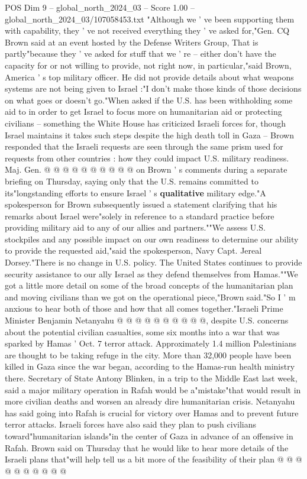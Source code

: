 \begin{textsample}{POS Dim 9 – global\_north\_2024\_03 – Score 1.00 – global\_north\_2024\_03/107058453.txt}  \label{ex:f9_pos_280}
"Although we ' ve been supporting them with capability, they ' ve not received everything they ' ve asked for,"Gen.
CQ Brown said at an event hosted by the Defense Writers Group, That is partly"because they ' ve asked for stuff that we ' re -- either don't have the capacity for or not willing to provide, not right now, in particular,"said Brown, America ' s top military officer.
He did not provide details about what weapons systems are not being given to Israel :"I don't make those kinds of those decisions on what goes or doesn't go."When asked if the U.S. has been withholding some aid to in order to get Israel to focus more on humanitarian aid or protecting civilians -- something the White House has criticized Israeli forces for, though Israel maintains it takes such steps despite the high death toll in Gaza -- Brown responded that the Israeli requests are seen through the same prism used for requests from other countries : how they could impact U.S. military readiness.
Maj.
Gen. @ @ @ @ @ @ @ @ @ @ on Brown ' s comments during a separate briefing on Thursday, saying only that the U.S. remains committed to its"longstanding efforts to ensure Israel ' s \textbf{qualitative} military edge."A spokesperson for Brown subsequently issued a statement clarifying that his remarks about Israel were"solely in reference to a standard practice before providing military aid to any of our allies and partners.""We assess U.S. stockpiles and any possible impact on our own readiness to determine our ability to provide the requested aid,"said the spokesperson, Navy Capt.
Jereal Dorsey."There is no change in U.S. policy.
The United States continues to provide security assistance to our ally Israel as they defend themselves from Hamas.""We got a little more detail on some of the broad concepts of the humanitarian plan and moving civilians than we got on the operational piece,"Brown said."So I ' m anxious to hear both of those and how that all comes together."Israeli Prime Minister Benjamin Netanyahu @ @ @ @ @ @ @ @ @ @, despite U.S. concerns about the potential civilian casualties, some six months into a war that was sparked by Hamas ' Oct. 7 terror attack.
Approximately 1.4 million Palestinians are thought to be taking refuge in the city.
More than 32,000 people have been killed in Gaza since the war began, according to the Hamas-run health ministry there.
Secretary of State Antony Blinken, in a trip to the Middle East last week, said a major military operation in Rafah would be a"mistake"that would result in more civilian deaths and worsen an already dire humanitarian crisis.
Netanyahu has said going into Rafah is crucial for victory over Hamas and to prevent future terror attacks.
Israeli forces have also said they plan to push civilians toward"humanitarian islands"in the center of Gaza in advance of an offensive in Rafah.
Brown said on Thursday that he would like to hear more details of the Israeli plans that"will help tell us a bit more of the feasibility of their plan @ @ @ @ @ @ @ @ @ @

\end{textsample}
